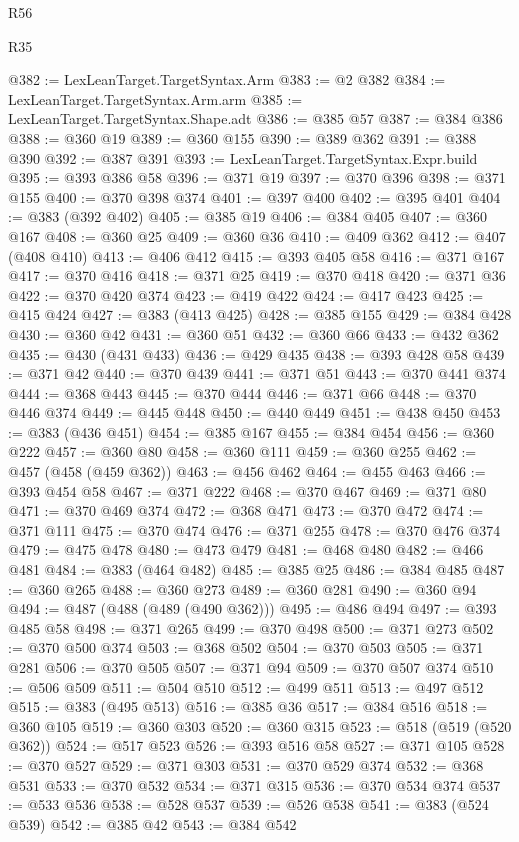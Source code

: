 \begin{lexlean}{R56}
\begin{lexlean}{R35}
\begin{coremodule}
{{{{{{{{{{{{{{{{{{{{{{{{{{{{{{{{{{{{{{{{{{{{{{{{{{{{@382 := LexLeanTarget.TargetSyntax.Arm
@383 := @2 @382
@384 := LexLeanTarget.TargetSyntax.Arm.arm
@385 := LexLeanTarget.TargetSyntax.Shape.adt
@386 := @385 @57
@387 := @384 @386
@388 := @360 @19
@389 := @360 @155
@390 := @389 @362
@391 := @388 @390
@392 := @387 @391
@393 := LexLeanTarget.TargetSyntax.Expr.build
@395 := @393 @386 @58
@396 := @371 @19
@397 := @370 @396
@398 := @371 @155
@400 := @370 @398 @374
@401 := @397 @400
@402 := @395 @401
@404 := @383 (@392 @402)
@405 := @385 @19
@406 := @384 @405
@407 := @360 @167
@408 := @360 @25
@409 := @360 @36
@410 := @409 @362
@412 := @407 (@408 @410)
@413 := @406 @412
@415 := @393 @405 @58
@416 := @371 @167
@417 := @370 @416
@418 := @371 @25
@419 := @370 @418
@420 := @371 @36
@422 := @370 @420 @374
@423 := @419 @422
@424 := @417 @423
@425 := @415 @424
@427 := @383 (@413 @425)
@428 := @385 @155
@429 := @384 @428
@430 := @360 @42
@431 := @360 @51
@432 := @360 @66
@433 := @432 @362
@435 := @430 (@431 @433)
@436 := @429 @435
@438 := @393 @428 @58
@439 := @371 @42
@440 := @370 @439
@441 := @371 @51
@443 := @370 @441 @374
@444 := @368 @443
@445 := @370 @444
@446 := @371 @66
@448 := @370 @446 @374
@449 := @445 @448
@450 := @440 @449
@451 := @438 @450
@453 := @383 (@436 @451)
@454 := @385 @167
@455 := @384 @454
@456 := @360 @222
@457 := @360 @80
@458 := @360 @111
@459 := @360 @255
@462 := @457 (@458 (@459 @362))
@463 := @456 @462
@464 := @455 @463
@466 := @393 @454 @58
@467 := @371 @222
@468 := @370 @467
@469 := @371 @80
@471 := @370 @469 @374
@472 := @368 @471
@473 := @370 @472
@474 := @371 @111
@475 := @370 @474
@476 := @371 @255
@478 := @370 @476 @374
@479 := @475 @478
@480 := @473 @479
@481 := @468 @480
@482 := @466 @481
@484 := @383 (@464 @482)
@485 := @385 @25
@486 := @384 @485
@487 := @360 @265
@488 := @360 @273
@489 := @360 @281
@490 := @360 @94
@494 := @487 (@488 (@489 (@490 @362)))
@495 := @486 @494
@497 := @393 @485 @58
@498 := @371 @265
@499 := @370 @498
@500 := @371 @273
@502 := @370 @500 @374
@503 := @368 @502
@504 := @370 @503
@505 := @371 @281
@506 := @370 @505
@507 := @371 @94
@509 := @370 @507 @374
@510 := @506 @509
@511 := @504 @510
@512 := @499 @511
@513 := @497 @512
@515 := @383 (@495 @513)
@516 := @385 @36
@517 := @384 @516
@518 := @360 @105
@519 := @360 @303
@520 := @360 @315
@523 := @518 (@519 (@520 @362))
@524 := @517 @523
@526 := @393 @516 @58
@527 := @371 @105
@528 := @370 @527
@529 := @371 @303
@531 := @370 @529 @374
@532 := @368 @531
@533 := @370 @532
@534 := @371 @315
@536 := @370 @534 @374
@537 := @533 @536
@538 := @528 @537
@539 := @526 @538
@541 := @383 (@524 @539)
@542 := @385 @42
@543 := @384 @542
}}}}}}}}}}}}}}}}}}}}}}}}}}}}}}}}}}}}}}}}}}}}}}}}}}}}
\end{coremodule}
\end{lexlean}
\end{lexlean}
